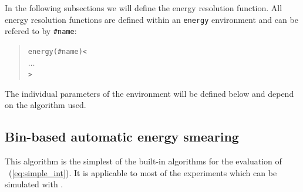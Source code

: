 In the following subsections we will define the energy resolution function.
All energy resolution functions are defined within an {\tt energy} environment and can be refered to by {\tt \#name}:
\begin{quote}
  {\tt energy(\#name)<\\
\tb $\ldots$\\
>}
\end{quote}
The individual parameters of the environment will be defined below and depend on the algorithm used.

\subsection{Bin-based automatic energy smearing}

This algorithm is the simplest of the built-in algorithms for the evaluation
of \eq~(\ref{eq:simple_int}). It is applicable to most of the
experiments which can be simulated with \GLOBES .

